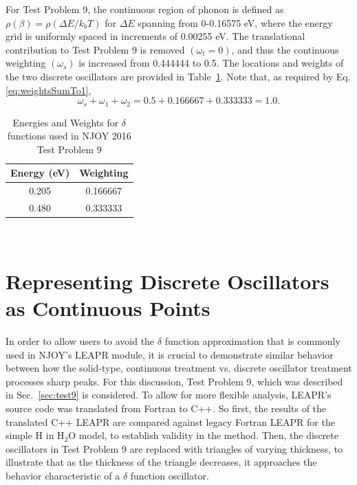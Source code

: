 \documentclass[Master.tex]{subfiles}
\begin{document}
  For Test Problem 9, the continuous region of phonon is defined as $\rho(\beta)=\rho(\Delta E/k_bT)$ for $\Delta E$ spanning from 0-0.16575 eV, where the energy grid is uniformly spaced in increments of 0.00255 eV. The translational contribution to Test Problem 9 is removed $(\omega_t=0)$, and thus the continuous weighting $(\omega_s)$ is increased from 0.444444 to 0.5.  The locations and weights of the two discrete oscillators are provided in Table~\ref{tab:test9_delta_facts}. Note that, as required by Eq.\ref{eq:weightsSumTo1}, 
  \begin{equation}
    \omega_s+\omega_1+\omega_2= 0.5 + 0.166667 + 0.333333 = 1.0.
  \end{equation}
  \begin{table}
    \centering
    \caption[Energies and Weights for $\delta$ functions used in NJOY 2016 Test Problem 9]{Energies and Weights for $\delta$ functions used in NJOY 2016 Test Problem 9}
    \label{tab:test9_delta_facts}
    \begin{tabular}{ |c|c| }\hline
      Energy (eV)& Weighting\\\hline
      0.205& 0.166667\\\hline
      0.480 & 0.333333 \\\hline
    \end{tabular}\\[1ex]
  \end{table}



\section{Representing Discrete Oscillators as Continuous Points}
  In order to allow users to avoid the $\delta$ function approximation that is commonly used in NJOY's LEAPR module, it is crucial to demonstrate similar behavior between how the solid-type, continuous treatment vs. discrete oscillator treatment processes sharp peaks. For this discussion, Test Problem 9, which was described in Sec.~\ref{sec:test9} is considered. To allow for more flexible analysis, LEAPR's source code was translated from Fortran to C++. So first, the results of the translated C++ LEAPR are compared against legacy Fortran LEAPR for the simple H in H$_2$O model, to establish validity in the method. Then, the discrete oscillators in Test Problem 9 are replaced with triangles of varying thickness, to illustrate that as the thickness of the triangle decreases, it approaches the behavior characteristic of a $\delta$ function oscillator.
\end{document}
